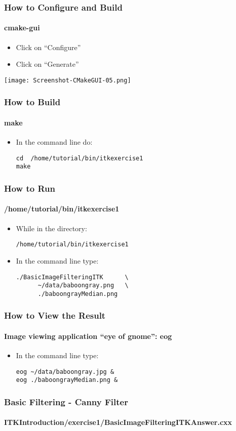 \begin{frame}[fragile]
\frametitle{How to Configure and Build}
\framesubtitle{cmake-gui}
\begin{itemize}
\item Click on ``Configure''
\item Click on ``Generate''
\end{itemize}
\begin{center}
  \texttt{[image: Screenshot-CMakeGUI-05.png]}
\end{center}
\end{frame}

\begin{frame}[fragile]
\frametitle{How to Build}
\framesubtitle{make}
\begin{itemize}
\item In the command line do:
\begin{verbatim}
cd  /home/tutorial/bin/itkexercise1
make
\end{verbatim}
\end{itemize}
\end{frame}

\begin{frame}[fragile]
\frametitle{How to Run}
\framesubtitle{/home/tutorial/bin/itkexercise1}
\begin{itemize}
\item While in the directory:
\begin{verbatim}
/home/tutorial/bin/itkexercise1
\end{verbatim}
\item In the command line type:
\begin{verbatim}
./BasicImageFilteringITK      \
      ~/data/baboongray.png   \
      ./baboongrayMedian.png
\end{verbatim}
\end{itemize}
\end{frame}

\begin{frame}[fragile]
\frametitle{How to View the Result}
\framesubtitle{Image viewing application ``eye of gnome'': eog}
\begin{itemize}
\item In the command line type:
\begin{verbatim}
eog ~/data/baboongray.jpg &
eog ./baboongrayMedian.png &
\end{verbatim}
\end{itemize}
\end{frame}


\begin{frame}
\frametitle{Basic Filtering - Canny Filter}
\framesubtitle{ITKIntroduction/exercise1/BasicImageFilteringITKAnswer.cxx}
\end{frame}

